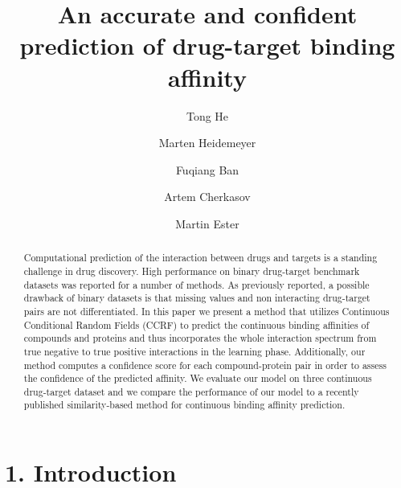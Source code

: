 \documentclass[
journal=jacsat, %
manuscript=article]{achemso}
\author{Tong He}
\affiliation[Simon Fraser University, Canada]
{Simon Fraser University, Canada}
\author{Marten Heidemeyer}
\affiliation[Simon Fraser University, Canada]
{Simon Fraser University, Canada}
\author{Fuqiang Ban}
\affiliation[Vancouver Prostate Center]
{Vancouver Prostate Center}
\author{Artem Cherkasov}
\affiliation[Vancouver Prostate Center]
{Vancouver Prostate Center}
\author{Martin Ester}
\affiliation[Simon Fraser University, Canada]
{Simon Fraser University, Canada}
\title[\texttt{achemso} demonstration]
{An accurate and confident prediction of drug-target binding affinity}
\begin{document}
\begin{abstract}
Computational prediction of the interaction between drugs and targets is a standing challenge in drug discovery. High performance on binary drug-target benchmark datasets was reported for a number of methods. As previously reported, a possible drawback of binary datasets is that missing values and non interacting drug-target pairs are not differentiated. In this paper we present a method that utilizes Continuous Conditional Random Fields (CCRF) to predict the continuous binding affinities of compounds and proteins and thus incorporates the whole interaction spectrum from true negative to true positive interactions in the learning phase. Additionally, our method computes a confidence score for each compound-protein pair in order to assess the confidence of the predicted affinity. We evaluate our model on three continuous drug-target dataset and we compare the performance of our model to a recently published similarity-based method for continuous binding affinity prediction. 

\end{abstract}

\section{1. Introduction}
\end{document}
